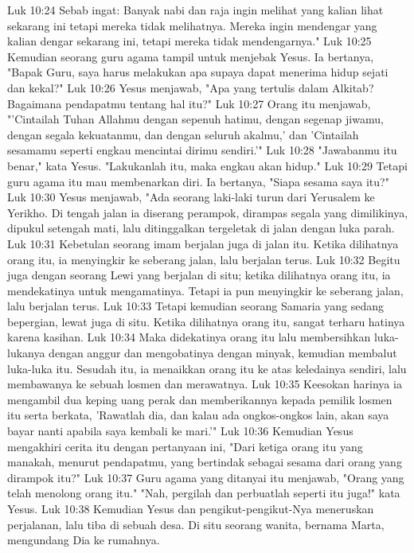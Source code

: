 Luk 10:24  Sebab ingat: Banyak nabi dan raja ingin melihat yang kalian lihat sekarang ini tetapi mereka tidak melihatnya. Mereka ingin mendengar yang kalian dengar sekarang ini, tetapi mereka tidak mendengarnya."
Luk 10:25  Kemudian seorang guru agama tampil untuk menjebak Yesus. Ia bertanya, "Bapak Guru, saya harus melakukan apa supaya dapat menerima hidup sejati dan kekal?"
Luk 10:26  Yesus menjawab, "Apa yang tertulis dalam Alkitab? Bagaimana pendapatmu tentang hal itu?"
Luk 10:27  Orang itu menjawab, "'Cintailah Tuhan Allahmu dengan sepenuh hatimu, dengan segenap jiwamu, dengan segala kekuatanmu, dan dengan seluruh akalmu,' dan 'Cintailah sesamamu seperti engkau mencintai dirimu sendiri.'"
Luk 10:28  "Jawabanmu itu benar," kata Yesus. "Lakukanlah itu, maka engkau akan hidup."
Luk 10:29  Tetapi guru agama itu mau membenarkan diri. Ia bertanya, "Siapa sesama saya itu?"
Luk 10:30  Yesus menjawab, "Ada seorang laki-laki turun dari Yerusalem ke Yerikho. Di tengah jalan ia diserang perampok, dirampas segala yang dimilikinya, dipukul setengah mati, lalu ditinggalkan tergeletak di jalan dengan luka parah.
Luk 10:31  Kebetulan seorang imam berjalan juga di jalan itu. Ketika dilihatnya orang itu, ia menyingkir ke seberang jalan, lalu berjalan terus.
Luk 10:32  Begitu juga dengan seorang Lewi yang berjalan di situ; ketika dilihatnya orang itu, ia mendekatinya untuk mengamatinya. Tetapi ia pun menyingkir ke seberang jalan, lalu berjalan terus.
Luk 10:33  Tetapi kemudian seorang Samaria yang sedang bepergian, lewat juga di situ. Ketika dilihatnya orang itu, sangat terharu hatinya karena kasihan.
Luk 10:34  Maka didekatinya orang itu lalu membersihkan luka-lukanya dengan anggur dan mengobatinya dengan minyak, kemudian membalut luka-luka itu. Sesudah itu, ia menaikkan orang itu ke atas keledainya sendiri, lalu membawanya ke sebuah losmen dan merawatnya.
Luk 10:35  Keesokan harinya ia mengambil dua keping uang perak dan memberikannya kepada pemilik losmen itu serta berkata, 'Rawatlah dia, dan kalau ada ongkos-ongkos lain, akan saya bayar nanti apabila saya kembali ke mari.'"
Luk 10:36  Kemudian Yesus mengakhiri cerita itu dengan pertanyaan ini, "Dari ketiga orang itu yang manakah, menurut pendapatmu, yang bertindak sebagai sesama dari orang yang dirampok itu?"
Luk 10:37  Guru agama yang ditanyai itu menjawab, "Orang yang telah menolong orang itu." "Nah, pergilah dan perbuatlah seperti itu juga!" kata Yesus.
Luk 10:38  Kemudian Yesus dan pengikut-pengikut-Nya meneruskan perjalanan, lalu tiba di sebuah desa. Di situ seorang wanita, bernama Marta, mengundang Dia ke rumahnya.
